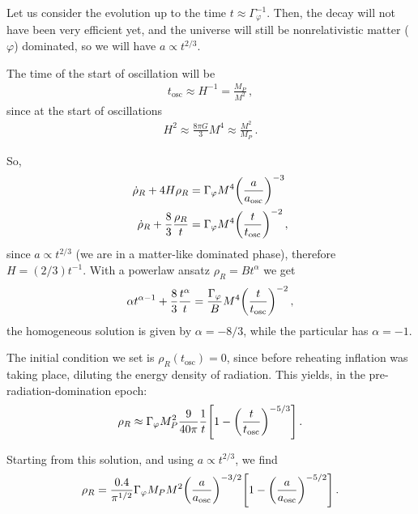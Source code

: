 \documentclass[main.tex]{subfiles}
\begin{document}
Let us consider the evolution up to the time \(t \approx \Gamma _\varphi^{-1}\). Then, the decay will not have been very efficient yet, and the universe will still be nonrelativistic matter (\(\varphi \)) dominated, so we will have \(a \propto t^{2/3}\).

The time of the start of oscillation will be 
%
\begin{align}
t _{\text{osc}} \approx H^{-1} = \frac{M_P}{M^2}
\,,
\end{align}
%
since at the start of oscillations
%
\begin{align}
H^2 \approx \frac{8 \pi G}{3} M^{4} \approx \frac{M^2}{M_P}
\,.
\end{align}

So, 
%
\begin{align}
\dot{\rho}_R + 4 H \rho _R &= \Gamma _\varphi M^4  \qty( \frac{a}{a _{\text{osc}}})^{-3} \\
\dot{\rho}_R + \frac{8}{3} \frac{\rho _R}{t} &=
\Gamma _\varphi M^{4} \qty( \frac{t}{t _{\text{osc}}})^{-2} 
\,,
\end{align}
%
since \(a \propto t^{2/3}\) (we are in a matter-like dominated phase), therefore \(H = (2/3) t^{-1}\).
With a powerlaw ansatz \(\rho _R = B t^{\alpha }\) we get 
%
\begin{align}
\alpha t^{\alpha -1} + \frac{8}{3} \frac{t^{\alpha }}{t} = \frac{\Gamma _\varphi }{B} M^{4} \qty(\frac{t}{ t _{\text{osc}}})^{-2}
\,,
\end{align}
%
the homogeneous solution is given by \(\alpha = - 8 /3\), while the particular has \(\alpha = -1\). 

The initial condition we set is \(\rho _R (t _{\text{osc}}) = 0\), since before reheating inflation was taking place, diluting the energy density of radiation. 
This yields, in the pre-radiation-domination epoch:
%
\begin{align}
\rho _R \approx \Gamma _\varphi M_P^2 \frac{9}{40 \pi } \frac{1}{t} \qty[ 1 - \qty( \frac{t}{t _{\text{osc}}})^{-5/3}]
\,.
\end{align}



Starting from this solution, and using \(a \propto t^{2/3}\), we find 
%
\begin{align}
\rho _R = \frac{\num{.4}}{\pi^{1/2}} \Gamma _\varphi M_P M^2 \qty(\frac{a}{a _{\text{osc}}})^{-3/2} \qty[1 - \qty(\frac{a}{a _{\text{osc}}})^{- 5/2}]
\,.
\end{align}
\end{document}
